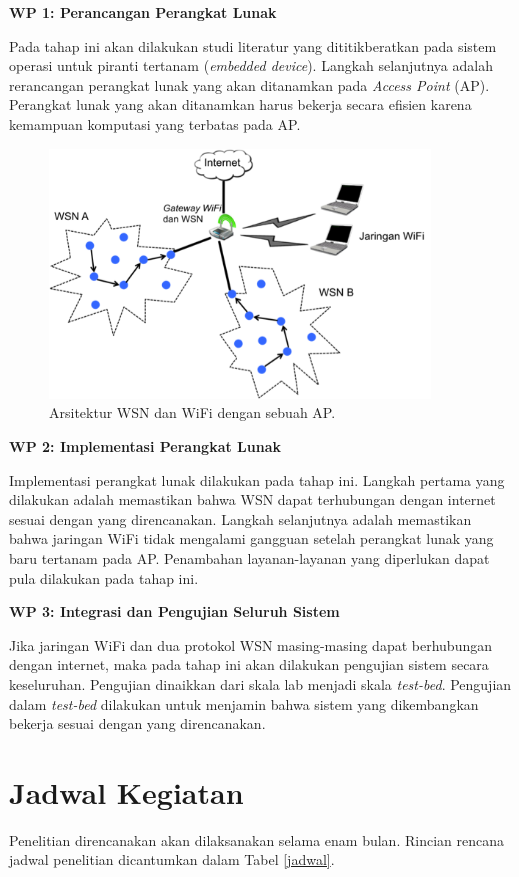 	\noindent\textbf{WP 1: Perancangan Perangkat Lunak}

	Pada tahap ini akan dilakukan studi literatur yang dititikberatkan pada sistem operasi untuk piranti tertanam (\emph{embedded device}). Langkah selanjutnya adalah rerancangan perangkat lunak yang akan ditanamkan pada \emph{Access Point} (AP). Perangkat lunak yang akan ditanamkan harus bekerja secara efisien karena kemampuan komputasi yang terbatas pada AP.

		\begin{figure}[ht!]
		  \centering
		    \includegraphics[width=0.9\textwidth]{gambar/wifi}
		    \caption{Arsitektur WSN dan WiFi dengan sebuah AP.}
		    \label{wifi}
		\end{figure}

	\noindent\textbf{WP 2: Implementasi Perangkat Lunak}

	Implementasi perangkat lunak dilakukan pada tahap ini. Langkah pertama yang dilakukan adalah memastikan bahwa WSN dapat terhubungan dengan internet sesuai dengan yang direncanakan. Langkah selanjutnya adalah memastikan bahwa jaringan WiFi tidak mengalami gangguan setelah perangkat lunak yang baru tertanam pada AP. Penambahan layanan-layanan yang diperlukan dapat pula dilakukan pada tahap ini.

	\noindent\textbf{WP 3: Integrasi dan Pengujian Seluruh Sistem}

	Jika jaringan WiFi dan dua protokol WSN masing-masing dapat berhubungan dengan internet, maka pada tahap ini akan dilakukan pengujian sistem secara keseluruhan. Pengujian dinaikkan dari skala lab menjadi skala \emph{test-bed}. Pengujian dalam \emph{test-bed} dilakukan untuk menjamin bahwa sistem yang dikembangkan bekerja sesuai dengan yang direncanakan.


\section{Jadwal Kegiatan}
	Penelitian direncanakan akan dilaksanakan selama enam bulan. Rincian rencana jadwal penelitian dicantumkan dalam Tabel \ref{jadwal}.

